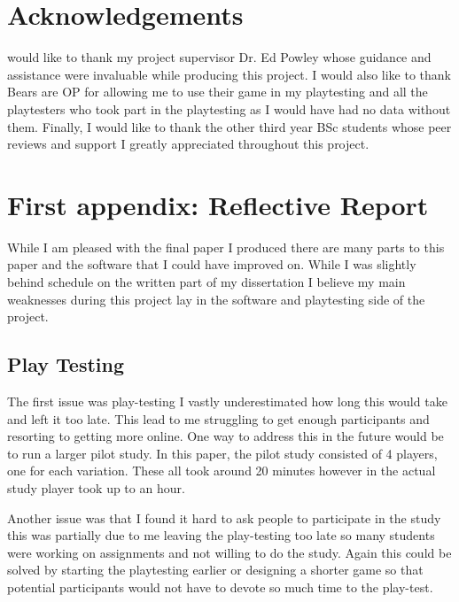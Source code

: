 \documentclass[journal]{IEEEtran}
\begin{document}
	\appendices
	\section{Acknowledgements}
	  would like to thank my project supervisor Dr. Ed Powley whose guidance and assistance were invaluable while producing this project.
	 I would also like to thank Bears are OP for allowing me to use their game in my playtesting and all the playtesters who took part in the playtesting as I would have had no data without them.
	 Finally, I would like to thank the other third year BSc students whose peer reviews and support I greatly appreciated throughout this project. 
	 
	\section{First appendix: Reflective Report}
	
	While I am pleased with the final paper I produced there are many parts to this paper and the software that I could have improved on. While I was slightly behind schedule on the written part of my dissertation I believe my main weaknesses during this project lay in the software and playtesting side of the project.    
	
	\subsection{Play Testing}
	The first issue was play-testing I vastly underestimated how long this would take and left it too late. This lead to me struggling to get enough participants and resorting to getting more online. One way to address this in the future would be to run a larger pilot study. In this paper, the pilot study consisted of 4 players, one for each variation. These all took around 20 minutes however in the actual study player took up to an hour. 
	
	Another issue was that I found it hard to ask people to participate in the study this was partially due to me leaving the play-testing too late so many students were working on assignments and not willing to do the study. Again this could be solved by starting the playtesting earlier or designing a shorter game so that potential participants would not have to devote so much time to the play-test.
	
\end{document}
